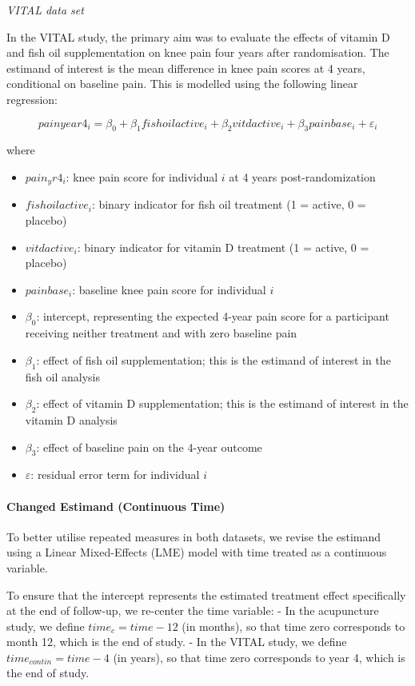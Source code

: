 \documentclass{article}
\providecommand{\tightlist}{%
  \setlength{\itemsep}{0pt}\setlength{\parskip}{0pt}}
\begin{document}
\emph{VITAL data set}

In the VITAL study, the primary aim was to evaluate the effects of
vitamin D and fish oil supplementation on knee pain four years after
randomisation. The estimand of interest is the mean difference in knee
pain scores at 4 years, conditional on baseline pain. This is modelled
using the following linear regression:

\[painyear4_i = \beta_0 + \beta_1 fishoilactive_i + \beta_2 vitdactive_i + \beta_3 painbase_i + \varepsilon_i\]

where

\begin{itemize}
\tightlist
\item
  \(pain_yr4_i\): knee pain score for individual \(i\) at 4 years
  post-randomization
\item
  \(fishoilactive_i\): binary indicator for fish oil treatment (1 =
  active, 0 = placebo)
\item
  \(vitdactive_i\): binary indicator for vitamin D treatment (1 =
  active, 0 = placebo)
\item
  \(painbase_i\): baseline knee pain score for individual \(i\)
\item
  \(\beta_0\): intercept, representing the expected 4-year pain score
  for a participant receiving neither treatment and with zero baseline
  pain
\item
  \(\beta_1\): effect of fish oil supplementation; this is the estimand
  of interest in the fish oil analysis
\item
  \(\beta_2\): effect of vitamin D supplementation; this is the estimand
  of interest in the vitamin D analysis
\item
  \(\beta_3\): effect of baseline pain on the 4-year outcome
\item
  \(\varepsilon\): residual error term for individual \(i\)
\end{itemize}

\paragraph{Changed Estimand (Continuous
Time)}\label{changed-estimand-continuous-time}

To better utilise repeated measures in both datasets, we revise the
estimand using a Linear Mixed-Effects (LME) model with time treated as a
continuous variable.

To ensure that the intercept represents the estimated treatment effect
specifically at the end of follow-up, we re-center the time variable: -
In the acupuncture study, we define \(time_c = time - 12\) (in months),
so that time zero corresponds to month 12, which is the end of study. -
In the VITAL study, we define \(time_{contin} = time - 4\) (in years),
so that time zero corresponds to year 4, which is the end of study.
\end{document}
